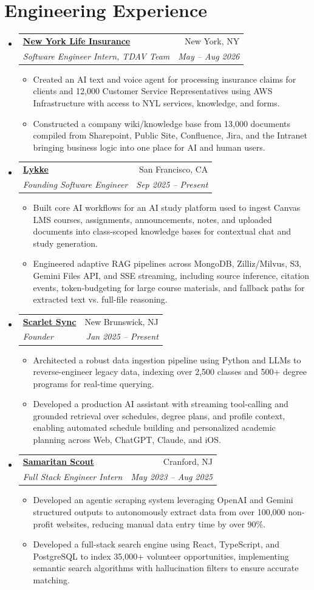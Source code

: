 \documentclass[letterpaper,11pt]{article}
\makeatletter
\newcommand{\resumeItem}[1]{
  \item\small{
    {#1 \vspace{-2pt}}
  }
}
\newcommand{\resumeSubheading}[4]{
  \vspace{-2pt}\item
    \begin{tabular*}{0.97\textwidth}[t]{l@{\extracolsep{\fill}}r}
      \textbf{#1} & #2 \\
      \textit{\small#3} & \textit{\small #4} \\
    \end{tabular*}\vspace{-7pt}
}
\newcommand{\resumeSubHeadingListStart}{\begin{itemize}[leftmargin=0.15in, label={}]}
\newcommand{\resumeSubHeadingListEnd}{\end{itemize}}
\newcommand{\resumeItemListStart}{\begin{itemize}}
\newcommand{\resumeItemListEnd}{\end{itemize}\vspace{-5pt}}
\makeatother
\begin{document}
\section{Engineering Experience}
  \resumeSubHeadingListStart
  \resumeSubheading
      {\href{https://newyorklife.com/}{New York Life Insurance}}{New York, NY}
      {Software Engineer Intern, TDAV Team}{May -- Aug 2026}
      \resumeItemListStart
        \resumeItem{Created an AI text and voice agent for processing insurance claims for clients and 12,000 Customer Service Representatives using AWS Infrastructure with access to NYL services, knowledge, and forms.}
        \resumeItem{Constructed a company wiki/knowledge base from 13,000 documents compiled from Sharepoint, Public Site, Confluence, Jira, and the Intranet bringing business logic into one place for AI and human users.}
      \resumeItemListEnd
    \resumeSubheading
  {\href{https://getlykke.com/}{Lykke}}{San Francisco, CA}
  {Founding Software Engineer}{Sep 2025 -- Present}
  \resumeItemListStart
    \resumeItem{Built core AI workflows for an AI study platform used to ingest Canvas LMS courses, assignments, announcements, notes, and uploaded documents into class-scoped knowledge bases for contextual chat and study generation.}
    \resumeItem{Engineered adaptive RAG pipelines across MongoDB, Zilliz/Milvus, S3, Gemini Files API, and SSE streaming, including source inference, citation events, token-budgeting for large course materials, and fallback paths for extracted text vs. full-file reasoning.}
  \resumeItemListEnd
    \resumeSubheading
      {\href{https://scarletsync.app/}{Scarlet Sync}}{New Brunswick, NJ}
      {Founder}{Jan 2025 -- Present}
      \resumeItemListStart
        \resumeItem{Architected a robust data ingestion pipeline using Python and LLMs to reverse-engineer legacy data, indexing over 2,500 classes and 500+ degree programs for real-time querying.}
        \resumeItem{Developed a production AI assistant with streaming tool-calling and grounded retrieval over schedules, degree plans, and profile context, enabling automated schedule building and personalized academic planning across Web, ChatGPT, Claude, and iOS.}
      \resumeItemListEnd
    \resumeSubheading
      {\href{https://www.samaritanscout.org/}{Samaritan Scout}}{Cranford, NJ}
      {Full Stack Engineer Intern}{May 2023 -- Aug 2025}
      \resumeItemListStart
        \resumeItem{Developed an agentic scraping system leveraging OpenAI and Gemini structured outputs to autonomously extract data from over 100,000 non-profit websites, reducing manual data entry time by over 90\%.}
        \resumeItem{Developed a full-stack search engine using React, TypeScript, and PostgreSQL to index 35,000+ volunteer opportunities, implementing semantic search algorithms with hallucination filters to ensure accurate matching.}
      \resumeItemListEnd
  \resumeSubHeadingListEnd
\end{document}
